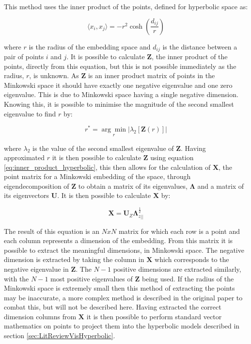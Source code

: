 This method uses the inner product of the points, defined for hyperbolic space as: 

\begin{equation}
\label{eq:inner_product_hyperbolic}
\langle x_i,x_j\rangle = -r^2\cosh \left(\frac{d_{ij}}{r}\right)
\end{equation}

where $r$ is the radius of the embedding space and $d_{ij}$ is the distance between a pair of points $i$ and $j$. It is possible to calculate $\boldsymbol{Z}$, the inner product of the points, directly from this equation, but this is not possible immediately as the radius, $r$, is unknown. As $\boldsymbol{Z}$ is an inner product matrix of points in the Minkowski space it should have exactly one negative eigenvalue and one zero eigenvalue. This is due to Minkowski space having a single negative dimension. Knowing this, it is possible to minimise the magnitude of the second smallest eigenvalue to find $r$ by:

\begin{equation}
\label{eq:argmin_hyperbolic}
r^*=\underset{r}{\arg\min}|\lambda_2[\boldsymbol{Z}(r)]|
\end{equation}

where $\lambda_2$ is the value of the second smallest eigenvalue of $\boldsymbol{Z}$. Having approximated $r$ it is then possible to calculate $\boldsymbol{Z}$ using equation \ref{eq:inner_product_hyperbolic}, this then allows for the calculation of $\boldsymbol{X}$, the point matrix for a Minkowski embedding of the space, through eigendecomposition of $\boldsymbol{Z}$ to obtain a matrix of its eigenvalues, $\boldsymbol{\Lambda}$ and a matrix of its eigenvectors $\boldsymbol{U}$. It is then possible to calculate $\boldsymbol{X}$ by:

\begin{equation}
\label{eq:embedding_x}
\boldsymbol{X}=\boldsymbol{U}_Z\boldsymbol{\Lambda}_{z||}^{\frac{1}{2}}
\end{equation}

The result of this equation is an $NxN$ matrix for which each row is a point and each column represents a dimension of the embedding. From this matrix it is possible to extract the meaningful dimensions, in Minkowski space. The negative dimension is extracted by taking the column in $\boldsymbol{X}$ which corresponds to the negative eigenvalue in $\boldsymbol{Z}$. The $N-1$ positive dimensions are extracted similarly, with the $N-1$ most positive eigenvalues of $\boldsymbol{Z}$ being used. If the radius of the Minkowski space is extremely small then this method of extracting the points may be inaccurate, a more complex method is described in the original paper to combat this, but will not be described here. Having extracted the correct dimension columns from $\boldsymbol{X}$ it is then possible to perform standard vector mathematics on points to project them into the hyperbolic models described in section \ref{sec:LitReviewVisHyperbolic}.
 

